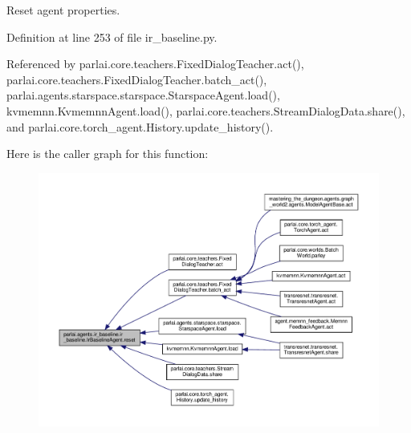 \begin{DoxyVerb}Reset agent properties.\end{DoxyVerb}
 

Definition at line 253 of file ir\+\_\+baseline.\+py.



Referenced by parlai.\+core.\+teachers.\+Fixed\+Dialog\+Teacher.\+act(), parlai.\+core.\+teachers.\+Fixed\+Dialog\+Teacher.\+batch\+\_\+act(), parlai.\+agents.\+starspace.\+starspace.\+Starspace\+Agent.\+load(), kvmemnn.\+Kvmemnn\+Agent.\+load(), parlai.\+core.\+teachers.\+Stream\+Dialog\+Data.\+share(), and parlai.\+core.\+torch\+\_\+agent.\+History.\+update\+\_\+history().

Here is the caller graph for this function\+:
\nopagebreak
\begin{figure}[H]
\begin{center}
\leavevmode
\includegraphics[width=350pt]{classparlai_1_1agents_1_1ir__baseline_1_1ir__baseline_1_1IrBaselineAgent_adc3f036e92741d87db95e47dfc5fc0ef_icgraph}
\end{center}
\end{figure}
\mbox{\label{classparlai_1_1agents_1_1ir__baseline_1_1ir__baseline_1_1IrBaselineAgent_af0deeaf3d545dac60187f95d30b48171}} 
